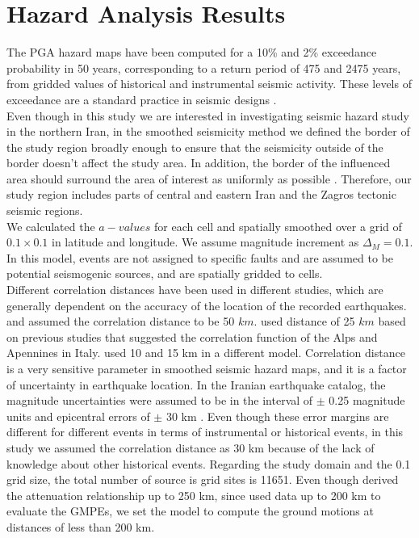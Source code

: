 \section{Hazard Analysis Results}

The PGA hazard maps have been computed for a 10\% and 2\% exceedance probability in 50 years, corresponding to a return period of 475 and 2475 years, from gridded values of historical and instrumental seismic activity. These levels of exceedance are a standard practice in seismic designs \citep{BHRC2014}.\\
\noindent
Even though in this study we are interested in investigating seismic hazard study in the northern Iran, in the smoothed seismicity method we defined the border of the study region broadly enough to ensure that the seismicity outside of the border doesn't affect the study area.  In addition, the border of the influenced area should surround the area of interest as uniformly as possible \citep{Lapajne1997}. Therefore, our study region includes parts of central and eastern Iran and the Zagros tectonic seismic regions.\\
\noindent
We calculated the $a-values$ for each cell and spatially smoothed over a grid of $0.1 \times 0.1$ in latitude and longitude. We assume magnitude increment as $\Delta_M = 0.1$. In this model, events are not assigned to specific faults and are assumed to be potential seismogenic sources, and are spatially gridded to cells. \\
\noindent
Different correlation distances have been used in different studies, which are generally dependent on the accuracy of the location of the recorded earthquakes. \citet{Frankel1995} and \citet{Boyd2008} assumed the correlation distance to be 50 $km$. \citet{Barani2007} used distance of 25 $km$ based on previous studies that suggested the correlation function of the Alps and Apennines in Italy. \citet{Foteva2006} used 10 and 15 km in a different model. Correlation distance is a very sensitive parameter in smoothed seismic hazard maps, and it is a factor of uncertainty in earthquake location. In the Iranian earthquake catalog, the magnitude uncertainties were assumed to be in the interval of $\pm$ 0.25 magnitude units and epicentral errors of $\pm$ 30 km \citep{Zare2012}. Even though these error margins are different for different events in terms of instrumental or historical events, in this study we assumed the correlation distance as 30 km because of the lack of knowledge about other historical events. Regarding the study domain and the 0.1 grid size, the total number of source is grid sites is 11651. Even though \citet{Kalkan2004} derived the attenuation relationship up to 250 km, since \citet{Zafarani2014} used data up to 200 km to evaluate the GMPEs, we set the model to compute the ground motions at distances of less than 200 km.


